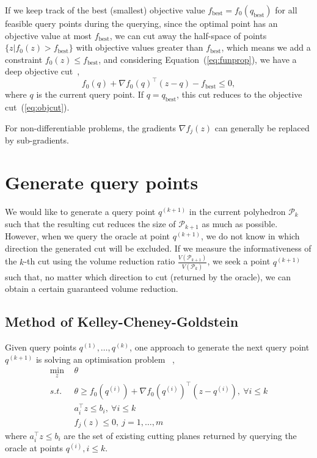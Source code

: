 \documentclass[9pt]{extarticle}
\begin{document}
If we keep track of the best (smallest) objective value $f_\text{best} = f_0(q_\text{best})$ for all feasible query points during the querying, 
since the optimal point has an objective value at most $f_\text{best}$, 
we can cut away the half-space of points $\{z | f_0(z) > f_\text{best} \}$ with objective values greater than $f_\text{best}$, 
which means we add a constraint $f_0(z) \le f_\text{best}$, and considering Equation~(\ref{eq:funprop}), 
we have a deep objective cut~\cite{boydlocalization},
\begin{equation}
\label{eq:deepobjcut}
f_0(q) + \nabla f_0(q)^\top (z - q) - f_\text{best} \le 0,
\end{equation}
where $q$ is the current query point. If $q = q_\text{best}$, this cut reduces to the objective cut~(\ref{eq:objcut}).

For non-differentiable problems, the gradients $\nabla f_j(z)$ can generally be replaced by sub-gradients.


\section{Generate query points}
\label{sec:query}

We would like to generate a query point $q^{(k+1)}$ in the current polyhedron $\mathcal{P}_{k}$ such that 
the resulting cut reduces the size of $\mathcal{P}_{k+1}$ as much as possible.
However, when we query the oracle at point $q^{(k+1)}$, we do not know in which direction the generated cut will be excluded.
If we measure the informativeness of the $k$-th cut using the volume reduction ratio $\frac{V(\mathcal{P}_{k+1})}{V(\mathcal{P}_{k})}$,
we seek a point $q^{(k+1)}$ such that, no matter which direction to cut (returned by the oracle), we can obtain a certain guaranteed volume reduction.


\subsection{Method of Kelley-Cheney-Goldstein}
\label{sec:kcg}

Given query points $q^{(1)}, \dots, q^{(k)}$, one approach to generate the next query point $q^{(k+1)}$ is solving an optimisation problem
~\cite{wulff2013analytic},
\begin{equation}
\label{eq:kcg}
\begin{aligned}
\min_{z} ~& \theta  \\
s.t.~~   ~& \theta \ge f_0(q^{(i)}) + \nabla f_0(q^{(i)})^\top (z - q^{(i)}),~ \forall i \le k \\
          & a_i^\top z \le b_i,~ \forall i \le k \\
          & f_j(z) \le 0,~ j = 1, \dots, m
\end{aligned}
\end{equation}
where $a_i^\top z \le b_i$ are the set of existing cutting planes returned by querying the oracle at points $q^{(i)}, i \le k$.
\end{document}
